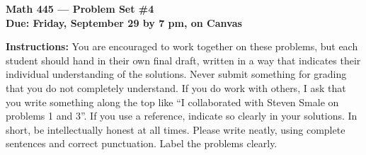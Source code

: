 \documentclass{amsart}
\begin{document}
\begin{center}
{\large\bfseries
Math 445 --- Problem Set \#4 \\
Due: Friday, September 29 by 7 pm, on Canvas}
\end{center}





{\bf Instructions:} You are encouraged to work together on these
problems, but each student should hand in their own final draft,
written in a way that indicates their individual understanding of
the solutions. Never submit something for grading
that you do not completely understand. If you do work with others, I ask that you write something along the
top like ``I collaborated with Steven Smale on problems 1 and 3''.
If you use a reference, indicate so clearly in your solutions. 
In short, be intellectually
honest at all times. Please write neatly, using complete sentences and correct
punctuation. Label the problems clearly. 
\end{document}

